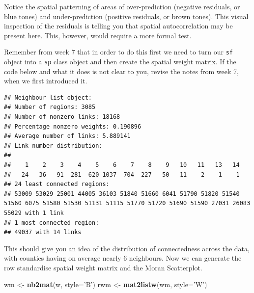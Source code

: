 \documentclass[]{book}
\newenvironment{Shaded}{\begin{snugshade}}{\end{snugshade}}
\newcommand{\CommentTok}[1]{\textcolor[rgb]{0.56,0.35,0.01}{\textit{#1}}}
\newcommand{\DataTypeTok}[1]{\textcolor[rgb]{0.13,0.29,0.53}{#1}}
\newcommand{\KeywordTok}[1]{\textcolor[rgb]{0.13,0.29,0.53}{\textbf{#1}}}
\newcommand{\NormalTok}[1]{#1}
\newcommand{\OperatorTok}[1]{\textcolor[rgb]{0.81,0.36,0.00}{\textbf{#1}}}
\newcommand{\StringTok}[1]{\textcolor[rgb]{0.31,0.60,0.02}{#1}}
\begin{document}
Notice the spatial patterning of areas of over-prediction (negative residuals, or blue tones) and under-prediction (positive residuals, or brown tones). This visual inspection of the residuals is telling you that spatial autocorrelation may be present here. This, however, would require a more formal test.

Remember from week 7 that in order to do this first we need to turn our \texttt{sf} object into a \texttt{sp} class object and then create the spatial weight matrix. If the code below and what it does is not clear to you, revise the notes from week 7, when we first introduced it.

\begin{Shaded}
\end{Shaded}

\begin{verbatim}
## Neighbour list object:
## Number of regions: 3085 
## Number of nonzero links: 18168 
## Percentage nonzero weights: 0.190896 
## Average number of links: 5.889141 
## Link number distribution:
## 
##    1    2    3    4    5    6    7    8    9   10   11   13   14 
##   24   36   91  281  620 1037  704  227   50   11    2    1    1 
## 24 least connected regions:
## 53009 53029 25001 44005 36103 51840 51660 6041 51790 51820 51540 51560 6075 51580 51530 51131 51115 51770 51720 51690 51590 27031 26083 55029 with 1 link
## 1 most connected region:
## 49037 with 14 links
\end{verbatim}

This should give you an idea of the distribution of connectedness across the data, with counties having on average nearly 6 neighbours. Now we can generate the row standardise spatial weight matrix and the Moran Scatterplot.

\begin{Shaded}
\begin{Highlighting}[]
\NormalTok{wm <-}\StringTok{ }\KeywordTok{nb2mat}\NormalTok{(w, }\DataTypeTok{style=}\StringTok{'B'}\NormalTok{)}
\NormalTok{rwm <-}\StringTok{ }\KeywordTok{mat2listw}\NormalTok{(wm, }\DataTypeTok{style=}\StringTok{'W'}\NormalTok{)}
\end{Highlighting}
\end{Shaded}
\end{document}
